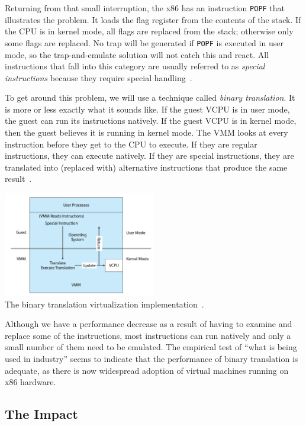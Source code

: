 Returning from that small interruption, the x86 has an instruction \texttt{POPF} that illustrates the problem. It loads the flag register from the contents of the stack. If the CPU is in kernel mode, all flags are replaced from the stack; otherwise only some flags are replaced. No trap will be generated if \texttt{POPF} is executed in user mode, so the trap-and-emulate solution will not catch this and react. All instructions that fall into this category are usually referred to as \textit{special instructions} because they require special handling~\cite{osc}.

To get around this problem, we will use a technique called \textit{binary translation}. It is more or less exactly what it sounds like. If the guest VCPU is in user mode, the guest can run its instructions natively. If the guest VCPU is in kernel mode, then the guest believes it is running in kernel mode. The VMM looks at every instruction before they get to the CPU to execute. If they are regular instructions, they can execute natively. If they are special instructions, they are translated into (replaced with) alternative instructions that produce the same result~\cite{osc}.

\begin{center}
	\includegraphics[width=0.5\textwidth]{images/binary-translation.png}\\
	The binary translation virtualization implementation~\cite{osc}.
\end{center}

Although we have a performance decrease as a result of having to examine and replace some of the instructions, most instructions can run natively and only a small number of them need to be emulated. The empirical test of ``what is being used in industry'' seems to indicate that the performance of binary translation is adequate, as there is now widespread adoption of virtual machines running on x86 hardware.

\subsection*{The Impact}

